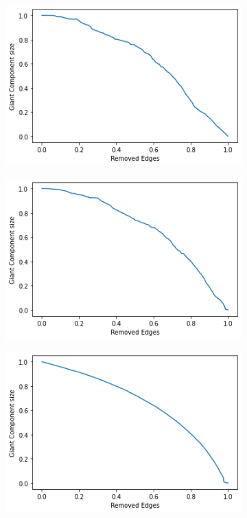     \begin{figure}[ht]
        \centering
        \begin{subfigure}{.3\textwidth}
            \caption{}
            \includegraphics[scale=.34]{6_Network_resilience/increasing_edges_removal.png}
            \label{fig:increasing_edges_removal}
        \end{subfigure}
        \centering
        \begin{subfigure}{.3\textwidth}
            \caption{}
            \includegraphics[scale=.34]{6_Network_resilience/decreasing_edges_removal.png}
            \label{fig:decreasing_edges_removal}
        \end{subfigure}
        \centering
        \begin{subfigure}{.3\textwidth}
            \caption{}
            \includegraphics[scale=.34]{6_Network_resilience/random_edges_removal.png}

\end{subfigure}
\end{figure}
